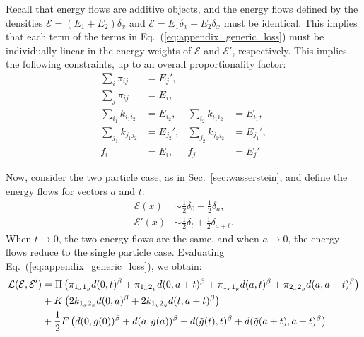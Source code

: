 \documentclass[letterpaper,11pt]{article}
\newcommand{\E}{\mathcal{E}}
\DeclareRobustCommand{\Sec}[1]{Sec.~\ref{sec:#1}}
\DeclareRobustCommand{\Eq}[1]{Eq.~(\ref{eq:#1})}
\begin{document}
Recall that energy flows are additive objects, and the energy flows defined by the densities $\E = (E_1 + E_2)\delta_x$ and $\E = E_1\delta_x + E_2\delta_x$ must be identical. This implies that each term of the terms in \Eq{appendix_generic_loss} must be individually linear in the energy weights of $\E$ and $\E'$, respectively.
%
This implies the following constraints, up to an overall proportionality factor:
%
\begin{align}
    \sum_i \pi_{ij} &= E_j', \label{eq:pii_constraint}  \\
    \sum_j \pi_{ij} &= E_i,  \label{eq:pij_constraint} \\
    \sum_{i_1} k_{i_1 i_2} &= E_{i_2}, & \sum_{i_2} k_{i_1 i_2} &= E_{i_1}, \label{eq:ki_constraint} \\
    \sum_{j_1} k_{j_1 j_2} &= E_{j_2}', & \sum_{j_2} k_{j_1 j_2} &= E_{j_1}', \label{eq:kj_constraint}\\
    f_i &= E_i, & f_j &= E_j'
\end{align}

Now, consider the two particle case, as in \Sec{wasserstein}, and
define the energy flows for vectors $a$ and $t$:
%
\begin{align}
    \E(x) &\sim \frac{1}{2}\delta_0 + \frac{1}{2}\delta_a, \\
    \E'(x) &\sim \frac{1}{2}\delta_t + \frac{1}{2}\delta_{a+t}.
\end{align}
%
When $t\to0$, the two energy flows are the same, and when $a\to0$, the energy flows reduce to the single particle case.
%
Evaluating \Eq{appendix_generic_loss}, we obtain:
%
\begin{align}
    \mathcal{L}(\E,\E') &= \Pi\left(\pi_{1_x1_y} d(0,t)^\beta + \pi_{1_x2_y} d(0,a+t)^\beta + \pi_{1_x1_y} d(a,t)^\beta + \pi_{2_x2_y} d(a,a+t)^\beta\right) \nonumber \\
    & + K\left(2k_{1_x2_x}d(0,a)^\beta + 2k_{1_y2_y}d(t,a+t)^\beta \right) \nonumber\\
    & + \frac{1}{2}F\left(d(0, g(0))^\beta + d(a, g(a))^\beta + d(\Tilde{g}(t), t)^\beta + d(\Tilde{g}(a+t), a+t)^\beta  \right). \label{eq:general_2particle}
\end{align}
\end{document}
